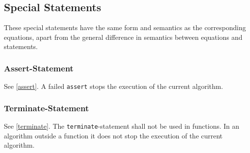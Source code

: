 \subsection{Special Statements}\label{special-statements}

These special statements have the same form and semantics as the corresponding equations, apart from the general difference in semantics between equations and statements.

\subsubsection{Assert-Statement}\label{assert-statement}

See \cref{assert}.
A failed \lstinline!assert! stops the execution of the current algorithm.

\subsubsection{Terminate-Statement}\label{terminate-statement}

See \cref{terminate}.
The \lstinline!terminate!-statement shall not be used in functions.
In an algorithm outside a function it does not stop the execution of the current algorithm.
